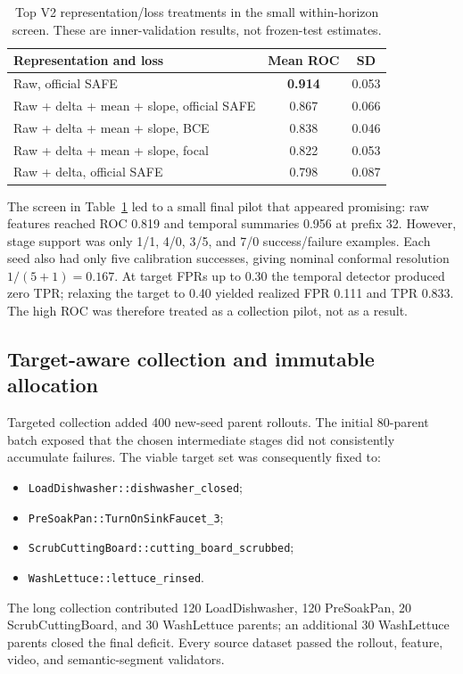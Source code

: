 \documentclass[11pt,a4paper]{article}
\newcommand{\code}[1]{\texttt{#1}}
\begin{document}
\begin{table}[H]
\centering
\caption{Top V2 representation/loss treatments in the small within-horizon screen. These are inner-validation results, not frozen-test estimates.}
\begin{tabular}{lcc}
\toprule
Representation and loss & Mean ROC & SD\\
\midrule
Raw, official SAFE & \textbf{0.914} & 0.053\\
Raw + delta + mean + slope, official SAFE & 0.867 & 0.066\\
Raw + delta + mean + slope, BCE & 0.838 & 0.046\\
Raw + delta + mean + slope, focal & 0.822 & 0.053\\
Raw + delta, official SAFE & 0.798 & 0.087\\
\bottomrule
\end{tabular}
\label{tab:v2-screen}
\end{table}

The screen in Table~\ref{tab:v2-screen} led to a small final pilot that
appeared promising: raw features reached ROC 0.819 and temporal summaries
0.956 at prefix 32. However, stage support was only 1/1, 4/0, 3/5, and 7/0
success/failure examples. Each seed also had only five calibration successes,
giving nominal conformal resolution $1/(5+1)=0.167$. At target FPRs up to 0.30
the temporal detector produced zero TPR; relaxing the target to 0.40 yielded
realized FPR 0.111 and TPR 0.833. The high ROC was therefore treated as a
collection pilot, not as a result.

\subsection{Target-aware collection and immutable allocation}
Targeted collection added 400 new-seed parent rollouts. The initial 80-parent batch exposed that the chosen intermediate stages did not consistently accumulate failures. The viable target set was consequently fixed to:
\begin{itemize}
\item \code{LoadDishwasher::dishwasher\_closed};
\item \code{PreSoakPan::TurnOnSinkFaucet\_3};
\item \code{ScrubCuttingBoard::cutting\_board\_scrubbed};
\item \code{WashLettuce::lettuce\_rinsed}.
\end{itemize}
The long collection contributed 120 LoadDishwasher, 120 PreSoakPan, 20 ScrubCuttingBoard, and 30 WashLettuce parents; an additional 30 WashLettuce parents closed the final deficit. Every source dataset passed the rollout, feature, video, and semantic-segment validators.
\end{document}
